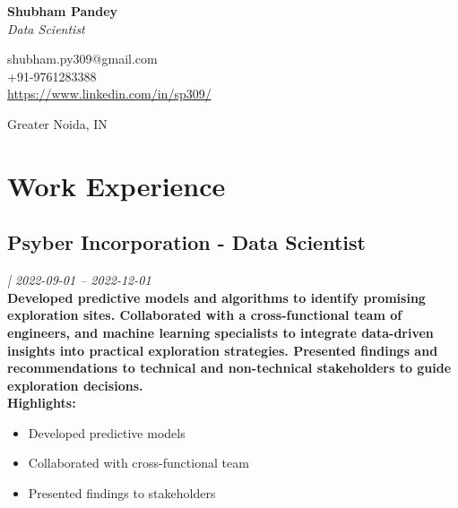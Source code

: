 \documentclass{article}
\begin{document}
\begin{center}
\textbf{\Huge{Shubham Pandey}}\\
\textit{Data Scientist}\\[5pt]
\begin{minipage}[t]{0.5\textwidth}
\begin{flushleft}
\faEnvelope\hspace{2pt}shubham.py309@gmail.com\\
\faPhone\hspace{2pt}+91-9761283388\\
\faGlobe\hspace{2pt}\href{https://www.linkedin.com/in/sp309/}{https://www.linkedin.com/in/sp309/}
\end{flushleft}
\end{minipage}
\begin{minipage}[t]{0.5\textwidth}
\begin{flushright}
Greater Noida, IN\\
\end{flushright}
\end{minipage}
\end{center}

\section{Work Experience}
\subsection{Psyber Incorporation - Data Scientist}
\textit{ | 2022-09-01 -- 2022-12-01}\\
\textbf{Developed predictive models and algorithms to identify promising exploration sites. Collaborated with a cross-functional team of engineers, and machine learning specialists to integrate data-driven insights into practical exploration strategies. Presented findings and recommendations to technical and non-technical stakeholders to guide exploration decisions.}\\
\textbf{Highlights:}
\begin{itemize}
\item Developed predictive models
\item Collaborated with cross-functional team
\item Presented findings to stakeholders
\end{itemize}
\end{document}
